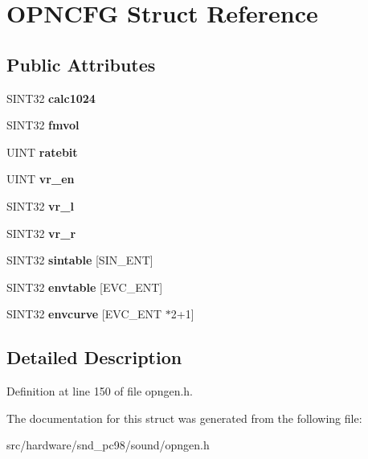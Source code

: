 \hypertarget{structOPNCFG}{\section{O\-P\-N\-C\-F\-G Struct Reference}
\label{structOPNCFG}
}
\subsection*{Public Attributes}
\begin{DoxyCompactItemize}
\item 
\hypertarget{structOPNCFG_a9d1031cf2cfa09bb3c5246a6c021bc70}{S\-I\-N\-T32 {\bfseries calc1024}}\label{structOPNCFG_a9d1031cf2cfa09bb3c5246a6c021bc70}

\item 
\hypertarget{structOPNCFG_ae10a40a4d7e215bfbccc98969f5939bc}{S\-I\-N\-T32 {\bfseries fmvol}}\label{structOPNCFG_ae10a40a4d7e215bfbccc98969f5939bc}

\item 
\hypertarget{structOPNCFG_aff6e543fcaa19b567b2a0d6891e09b04}{U\-I\-N\-T {\bfseries ratebit}}\label{structOPNCFG_aff6e543fcaa19b567b2a0d6891e09b04}

\item 
\hypertarget{structOPNCFG_a101c604625f805b6eadf552894d13647}{U\-I\-N\-T {\bfseries vr\-\_\-en}}\label{structOPNCFG_a101c604625f805b6eadf552894d13647}

\item 
\hypertarget{structOPNCFG_a9fc61289b9db8f5762837877d15527d2}{S\-I\-N\-T32 {\bfseries vr\-\_\-l}}\label{structOPNCFG_a9fc61289b9db8f5762837877d15527d2}

\item 
\hypertarget{structOPNCFG_af555682bb638496adeee8de37f2eb6e0}{S\-I\-N\-T32 {\bfseries vr\-\_\-r}}\label{structOPNCFG_af555682bb638496adeee8de37f2eb6e0}

\item 
\hypertarget{structOPNCFG_ab30803907a3b8c1b818e281414500f98}{S\-I\-N\-T32 {\bfseries sintable} \mbox{[}S\-I\-N\-\_\-\-E\-N\-T\mbox{]}}\label{structOPNCFG_ab30803907a3b8c1b818e281414500f98}

\item 
\hypertarget{structOPNCFG_a6dcc2259f7e86a28f99080edb44c6ccd}{S\-I\-N\-T32 {\bfseries envtable} \mbox{[}E\-V\-C\-\_\-\-E\-N\-T\mbox{]}}\label{structOPNCFG_a6dcc2259f7e86a28f99080edb44c6ccd}

\item 
\hypertarget{structOPNCFG_afe99ed66b1fcd13e3a9fb73ae3ba1f68}{S\-I\-N\-T32 {\bfseries envcurve} \mbox{[}E\-V\-C\-\_\-\-E\-N\-T $\ast$2+1\mbox{]}}\label{structOPNCFG_afe99ed66b1fcd13e3a9fb73ae3ba1f68}

\end{DoxyCompactItemize}


\subsection{Detailed Description}


Definition at line 150 of file opngen.\-h.



The documentation for this struct was generated from the following file\-:\begin{DoxyCompactItemize}
\item 
src/hardware/snd\-\_\-pc98/sound/opngen.\-h\end{DoxyCompactItemize}
